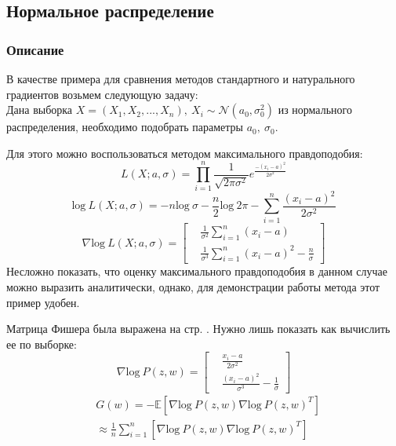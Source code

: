 \documentclass[a4paper,12pt]{article}
\begin{document}
\subsection{Нормальное распределение}
\subsubsection{Описание}
        В качестве примера для сравнения методов стандартного и натурального градиентов возьмем следующую задачу: \\ 
        Дана выборка $X = (X_1, X_2, ..., X_n), ~ X_i \sim \mathcal{N}(a_0, \sigma^2_0)$ из нормального распределения, необходимо подобрать параметры $a_0, ~ \sigma_0$.

        Для этого можно воспользоваться методом максимального правдоподобия:
        $$L(X; a, \sigma) = \prod_{i=1}^n \frac{1}{\sqrt{2\pi\sigma^2}}e^{\frac{-(x_i-a)^2}{2\sigma^2}}$$
        $$\mbox{log} ~ L(X; a, \sigma) = -n \mbox{log} ~ \sigma - \frac{n}{2} \mbox{log} ~ 2\pi - \sum_{i=1}^n \frac{(x_i-a)^2}{2\sigma^2}$$
        $$
            \nabla \mbox{log} ~ L(X; a, \sigma) = 
            \left[
                \begin{aligned}
                    & \frac{1}{\sigma^2}\sum_{i=1}^n (x_i - a) \\
                    & \frac{1}{\sigma^3}\sum_{i=1}^n (x_i - a)^2 - \frac{n}{\sigma}
                \end{aligned}
            \right]
        $$
        Несложно показать, что оценку максимального правдоподобия в данном случае можно выразить аналитически, однако, для демонстрации работы метода этот пример удобен.

        Матрица Фишера была выражена на стр. \pageref{FisherMatrix}.
        Нужно лишь показать как вычислить ее по выборке:
        $$
            \nabla \mbox{log} ~ P(z, w) = 
            \left[
                \begin{aligned}
                    & \frac{x_i - a}{2\sigma^2} \\
                    & \frac{(x_i - a)^2}{\sigma^3} - \frac{1}{\sigma}
                \end{aligned}
            \right]
        $$
        $$
            \begin{aligned}
                & G(w) = \mathbb{-E} \left[ \nabla \mbox{log} ~ P(z, w) \nabla \mbox{log} ~ P(z, w)^T \right] \\
                & \approx \frac{1}{n}\sum_{i=1}^n \left[ \nabla \mbox{log} ~ P(z, w) \nabla \mbox{log} ~ P(z, w)^T \right] \\
            \end{aligned}
        $$
\end{document}
